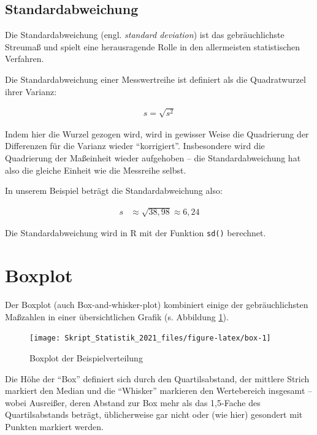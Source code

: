 \documentclass[
  11pt,
  ngerman,
  a4paper,
]{report}
\newenvironment{rtip}{
  \medskip
  \begin{tcolorbox}[colframe=purple,colback=light_gray,title=Softwarehinweis]
}{
  \end{tcolorbox}
  \medskip
}
\begin{document}
\hypertarget{standardabweichung}{%
\subsection{Standardabweichung}\label{standardabweichung}}

Die Standardabweichung (engl. \emph{standard deviation}) ist das gebräuchlichste Streumaß und spielt eine herausragende Rolle in den allermeisten statistischen Verfahren.

Die Standardabweichung einer Messwertreihe ist definiert als die Quadratwurzel ihrer Varianz:

\[
  \begin{aligned}
    s=\sqrt{s^2}
  \end{aligned}
  \label{eq:sd}
\]

Indem hier die Wurzel gezogen wird, wird in gewisser Weise die Quadrierung der Differenzen für die Varianz wieder \enquote{korrigiert}. Insbesondere wird die Quadrierung der Maßeinheit wieder aufgehoben -- die Standardabweichung hat also die gleiche Einheit wie die Messreihe selbst.

In unserem Beispiel beträgt die Standardabweichung also:

\[
  \begin{aligned}
    s&\approx\sqrt{38{,}98}
      \approx6{,}24
  \end{aligned}
\]

\begin{rtip}
Die Standardabweichung wird in R mit der Funktion \verb|sd()| berechnet.
\end{rtip}

\hypertarget{boxplot}{%
\section{Boxplot}\label{boxplot}}

Der Boxplot (auch Box-and-whisker-plot) kombiniert einige der gebräuchlichsten Maßzahlen in einer übersichtlichen Grafik (s. Abbildung \ref{fig:box}).

\begin{figure}[!h]

{\centering \texttt{[image: Skript\_Statistik\_2021\_files/figure-latex/box-1]} 

}

\caption{Boxplot der Beispielverteilung}\label{fig:box}
\end{figure}

Die Höhe der \enquote{Box} definiert sich durch den Quartilsabstand, der mittlere Strich markiert den Median und die \enquote{Whisker} markieren den Wertebereich insgesamt -- wobei Ausreißer, deren Abstand zur Box mehr als das 1,5-Fache des Quartilsabstands beträgt, üblicherweise gar nicht oder (wie hier) gesondert mit Punkten markiert werden.
\end{document}
